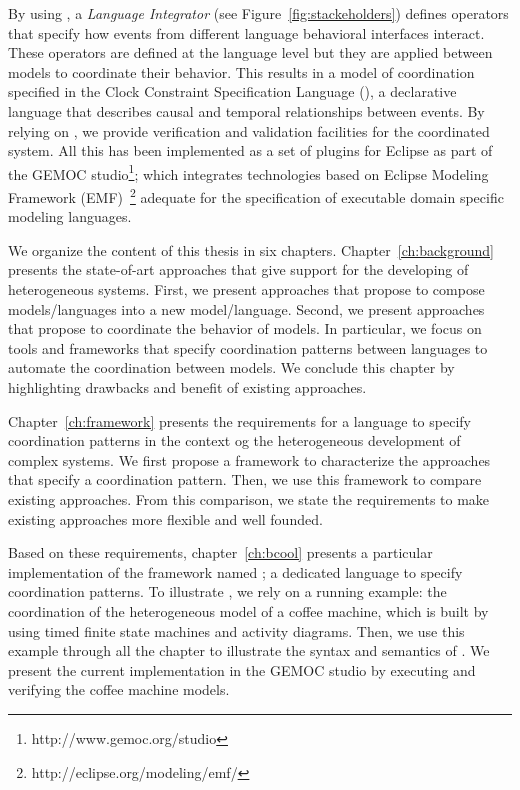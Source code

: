 By using \bcool, a \emph{Language Integrator} (see Figure~\ref{fig:stackeholders}) defines operators that specify how events from different language behavioral interfaces interact. These operators are defined at the language level but they are applied between models to coordinate their behavior. This results in a model of coordination specified in the Clock Constraint Specification Language (\ccsl), a declarative language that describes causal and temporal relationships between events. By relying on \ccsl, we provide verification and validation facilities for the coordinated system. All this has been implemented as a set of plugins for Eclipse as part of the GEMOC studio\footnote{http://www.gemoc.org/studio}; which integrates technologies based on Eclipse Modeling Framework (EMF)~\footnote{http://eclipse.org/modeling/emf/} adequate for the specification of executable domain specific modeling languages. %

We organize the content of this thesis in six chapters. Chapter~\ref{ch:background} presents the state-of-art approaches that give support for the developing of heterogeneous systems. First, we present approaches that propose to compose models/languages into a new model/language. Second, we present approaches that propose to coordinate the behavior of models. In particular, we focus on tools and frameworks that specify coordination patterns between languages to automate the coordination between models. We conclude this chapter by highlighting drawbacks and benefit of existing approaches.     
 
Chapter~\ref{ch:framework} presents the requirements for a language to specify coordination patterns in the context og the heterogeneous development of complex systems. We first propose a framework to characterize the approaches that specify a coordination pattern. Then, we use this framework to compare existing approaches. From this comparison, we state the requirements to make existing approaches more flexible and well founded. 

Based on these requirements, chapter~\ref{ch:bcool} presents a particular implementation of the framework named \bcool; a dedicated language to specify coordination patterns. To illustrate \bcool, we rely on a running example: the coordination of the heterogeneous model of a coffee machine, which is built by using timed finite state machines and activity diagrams. Then, we use this example through all the chapter to illustrate the syntax and semantics of \bcool. We present the current implementation in the GEMOC studio by executing and verifying the coffee machine models. 

